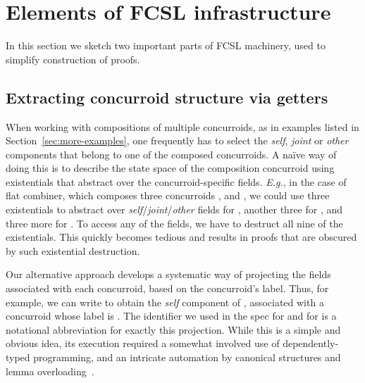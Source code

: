 
\section{Elements of FCSL infrastructure}
\label{sec:underhood}

In this section we sketch two important parts of FCSL machinery, used
to simplify construction of proofs.

\subsection{Extracting concurroid structure via getters}
\label{sec:getters}

When working with compositions of multiple concurroids, as in examples
listed in Section~\ref{sec:more-examples}, one frequently has to
select the \emph{self}, \emph{joint} or \emph{other} components that
belong to one of the composed concurroids. A na\"{i}ve way of doing this
is to describe the state space of the composition concurroid using 
existentials that abstract over the concurroid-specific
fields. \emph{E.g.}, in the case of flat combiner, which composes
three concurroids ,  and , we
could use three existentials to abstract over
\emph{self}/\emph{joint}/\emph{other} fields for , another
three for , and three more for . To access
any of the fields, we have to destruct all
nine of the existentials. This quickly becomes tedious and results in
proofs that are obscured by such existential destruction.

Our alternative approach develops a systematic way of projecting the
fields associated with each concurroid, based on the concurroid's
label. Thus, for example, we can write  to obtain
the \emph{self} component of , associated with a concurroid
whose label is . The identifier  we used in the
spec for  and for  is a notational
abbreviation for exactly this projection. While this is a simple and
obvious idea, its execution required a somewhat involved use of
dependently-typed programming, and an intricate automation by
canonical structures and lemma
overloading~\cite{Gonthier-al:ICFP11,Mahboubi-Tassi:ITP13}.


